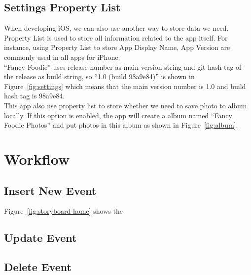 
\subsection{Settings Property List} %
\label{sub:settings_list}

	When developing iOS, we can also use another way to store data we need. Property List is used to store all information related to the app itself. For instance, using Property List to store App Display Name, App Version are commonly used in all apps for iPhone. \\
	
	``Fancy Foodie'' uses release number as main version string and git hash tag of the release as build string, so ``1.0 (build 98a9e84)'' is shown in Figure~\ref{fig:settings} which means that the main version number is 1.0 and build hash tag is 98a9e84. \\
	 
	 This app also use property list to store whether we need to save photo to album locally. If this option is enabled, the app will create a album  named ``Fancy Foodie Photos'' and put photos in this album as shown in Figure~\ref{fig:album}.
	 
 	 
\newpage

\section{Workflow} %
\label{sec:work_overflow}

\subsection{Insert New Event} %
\label{sub:insert_new_event}
	Figure~\ref{fig:storyboard-home} shows the 

\subsection{Update Event} %
\label{sub:update_event}



\subsection{Delete Event} %
\label{sub:delete_event}

